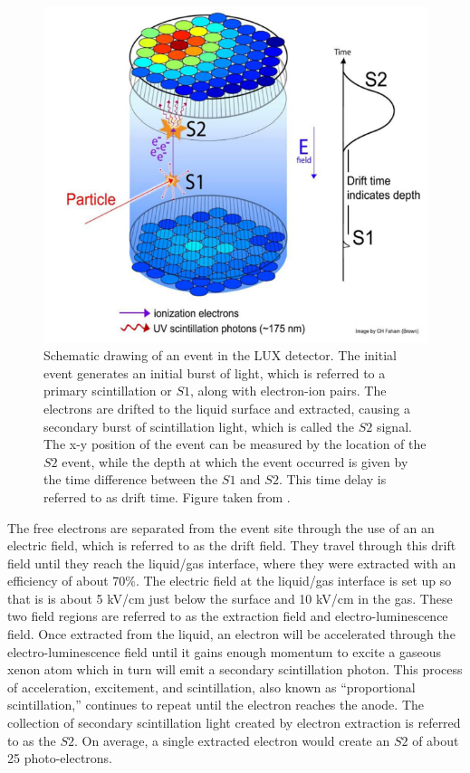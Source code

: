 \begin{figure}[!h]
\centering
\includegraphics[width=150mm]{Figures/luxevent.png}
\caption{Schematic drawing of an event in the LUX detector. The initial event generates an initial burst of light, which is referred to a primary scintillation or $S1$, along with electron-ion pairs. The electrons are drifted to the liquid surface and extracted, causing a secondary burst of scintillation light, which is called the $S2$ signal. The x-y position of the event can be measured by the location of the $S2$ event, while the depth at which the event occurred is given by the time difference between the $S1$ and $S2$. This time delay is referred to as drift time. Figure taken from \cite{lux2012}.}
\label{fig:lux} 
\end{figure}

The free electrons are separated from the event site through the use of an an electric field, which is referred to as the drift field. They travel through this drift field until they reach the liquid/gas interface, where they were extracted with an efficiency of about 70\%. The electric field at the liquid/gas interface is set up so that is is about 5 kV/cm just below the surface and 10 kV/cm in the gas. These two field regions are referred to as the extraction field and electro-luminescence field. Once extracted from the liquid, an electron will be accelerated through the electro-luminescence field until it gains enough momentum to excite a gaseous xenon atom which in turn will emit a secondary scintillation photon. This process of acceleration, excitement, and scintillation, also known as ``proportional scintillation,'' continues to repeat until the electron reaches the anode. The collection of secondary scintillation light created by electron extraction is referred to as the $S2$. On average, a single extracted electron would create an $S2$ of about 25 photo-electrons.

